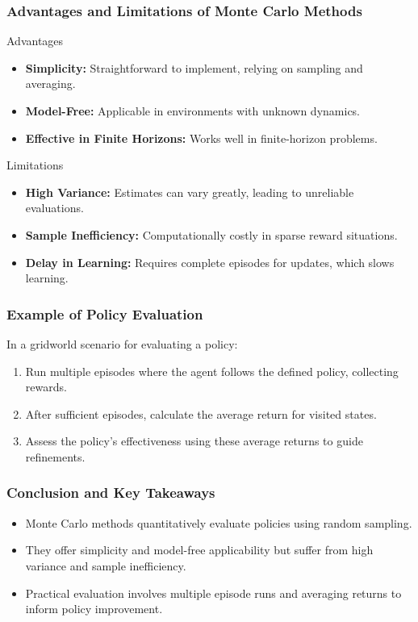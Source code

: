 \documentclass[aspectratio=169]{beamer}
\begin{document}
\begin{frame}[fragile]
    \frametitle{Advantages and Limitations of Monte Carlo Methods}
    \begin{block}{Advantages}
        \begin{itemize}
            \item \textbf{Simplicity:} Straightforward to implement, relying on sampling and averaging.
            \item \textbf{Model-Free:} Applicable in environments with unknown dynamics.
            \item \textbf{Effective in Finite Horizons:} Works well in finite-horizon problems.
        \end{itemize}
    \end{block}
    \begin{block}{Limitations}
        \begin{itemize}
            \item \textbf{High Variance:} Estimates can vary greatly, leading to unreliable evaluations.
            \item \textbf{Sample Inefficiency:} Computationally costly in sparse reward situations.
            \item \textbf{Delay in Learning:} Requires complete episodes for updates, which slows learning.
        \end{itemize}
    \end{block}
\end{frame}

\begin{frame}[fragile]
    \frametitle{Example of Policy Evaluation}
    In a gridworld scenario for evaluating a policy:
    \begin{enumerate}
        \item Run multiple episodes where the agent follows the defined policy, collecting rewards.
        \item After sufficient episodes, calculate the average return for visited states.
        \item Assess the policy's effectiveness using these average returns to guide refinements.
    \end{enumerate}
\end{frame}

\begin{frame}[fragile]
    \frametitle{Conclusion and Key Takeaways}
    \begin{itemize}
        \item Monte Carlo methods quantitatively evaluate policies using random sampling.
        \item They offer simplicity and model-free applicability but suffer from high variance and sample inefficiency.
        \item Practical evaluation involves multiple episode runs and averaging returns to inform policy improvement.
    \end{itemize}
\end{frame}
\end{document}
